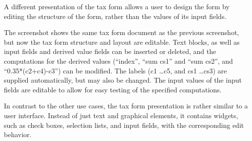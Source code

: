 
A different presentation of the tax form allows a user to design the form by editing the structure of the form, rather than the values of its input fields.


The screenshot shows the same tax form document as the previous screenshot, but now the tax form structure and layout are editable. Text blocks, as well as input fields and derived value fields can be inserted or deleted, and the computations for the derived values (``index'', ``sum cs1'' and ``sum cs2'', and ``0.35*(c2+c4)-c3'') can be modified. The labels (c1 \dots c5, and cs1 \dots cs3) are supplied automatically, but may also be changed. The input values of the input fields are editable to allow for easy testing of the specified computations. 



In contrast to the other use cases, the tax form presentation is rather similar to a user interface. Instead of just text and graphical elements, it contains widgets, such as check boxes, selection lists, and input fields, with the corresponding edit behavior.

